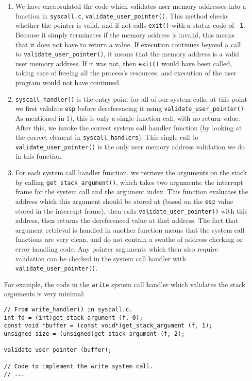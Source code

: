 \documentclass[a4wide, 11pt]{article}
\newcommand{\tx}{\texttt}
\begin{document}
\begin{enumerate}
\item We have encapsulated the code which validates user memory addresses into a function in \tx{syscall.c}, \tx{validate\_user\_pointer()}. This method checks whether the pointer is valid, and if not calls \tx{exit()} with a status code of \tx{-1}. Because it simply terminates if the memory address is invalid, this means that it does not have to return a value. If execution continues beyond a call to \tx{validate\_user\_pointer()}, it means that the memory address is a valid user memory address. If it was not, then \tx{exit()} would have been called, taking care of freeing all the process's resources, and execution of the user program would not have continued.
\item \tx{syscall\_handler()} is the entry point for all of our system calls; at this point we first validate \tx{esp} before dereferencing it using \tx{validate\_user\_pointer()}. As mentioned in 1), this is only a single function call, with no return value. After this, we invoke the correct system call handler function (by looking at the correct element in \tx{syscall\_handlers}). This single call to \tx{validate\_user\_pointer()} is the only user memory address validation we do in this function.
\item For each system call handler function, we retrieve the arguments on the stack by calling \tx{get\_stack\_argument()}, which takes two arguments: the interrupt frame for the system call and the argument index. This function evaluates the address which this argument should be stored at (based on the \tx{esp} value stored in the interrupt frame), then calls \tx{validate\_user\_pointer()} with this address, then returns the dereferenced value at that address. The fact that argument retrieval is handled in another function means that the system call functions are very clean, and do not contain a swathe of address checking or error handling code. Any pointer arguments which then also require validation can be checked in the system call handler with \tx{validate\_user\_pointer()}.
\end{enumerate}

For example, the code in the \tx{write} system call handler which validates the stack arguments is very minimal:

\begin{verbatim}
// From write_handler() in syscall.c.
int fd = (int)get_stack_argument (f, 0);
const void *buffer = (const void*)get_stack_argument (f, 1);
unsigned size = (unsigned)get_stack_argument (f, 2);

validate_user_pointer (buffer);

// Code to implement the write system call.
// ...
\end{verbatim}
\end{document}
